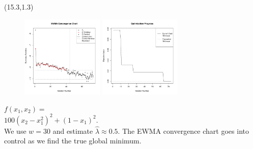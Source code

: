 \documentclass[a0,landscape]{a0poster}
\newcommand{\co}[2]{{{\bf \color{#1}{#2}}}}
\begin{document}


\begin{textblock}{8.8}(15.3,1.3)
\begin{figure}
\includegraphics[width=0.35\textwidth]{./figures/ewmaConvChartRoseEasyEasyBW.pdf}
\includegraphics[width=0.35\textwidth]{./figures/bestZRoseEasyEasyEnd.pdf}
\end{figure}

\vspace*{0.05in}
\noindent
\textsc{\LARGE\co{blue}{Rosenbrock}}

\vspace{0.06in}
\noindent
\textsc{\LARGE\co{blue}{Test Function}}

\large
\noindent
$f(x_1, x_2) =$\\ 
$100\left(x_2 \!-\! x_1^2\right)^2 \!+\! (1\!-\! x_1)^2$.\\
We use $w=30$ and estimate $\hat\lambda\approx 0.5$. The EWMA convergence
chart goes into control as we find the true global minimum.
\end{textblock}
\end{document}
